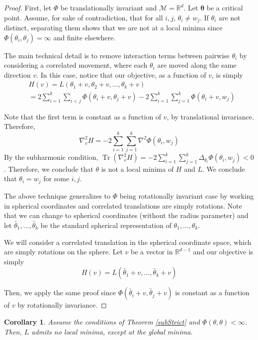 \documentclass{article}
\newtheorem{corollary}[theorem]{Corollary}
\newcommand{\R}{{\mathbb{R}}}
\DeclareMathOperator{\Tr}{Tr}
\begin{document}
\begin{proof}
First, let $\Phi$ be translationally invariant and $\mathcal{M} =
\R^d$. Let $\boldsymbol{\theta}$ be a critical point. Assume, for sake
of contradiction, that for all $i, j$, $\theta_i \neq w_j$. If
$\theta_i$ are not distinct, separating them shows that
we are not at a local minima since $\Phi(\theta_i,\theta_j) = \infty$
and finite elsewhere. 

The main technical detail is to remove interaction terms between
pairwise $\theta_i$ by considering a correlated movement, where each
$\theta_i$ are moved along the same direction $v$. In this case,
notice that our objective, as a function of $v$, is simply
\begin{align*}
& H(v) = L(\theta_1+ v, \theta_2 + v, ...,\theta_k + v) \\
& =  2\sum_{i=1}^k\sum_{i < j} \Phi(\theta_i+v,\theta_j+v) -
  2\sum_{i=1}^k\sum_{j=1}^k \Phi(\theta_i+v,w_j)
\end{align*}

Note that the first term is constant as a function of $v$, by
translational invariance. Therefore,
\[\nabla_{v}^2 H = -2\sum_{i=1}^k \sum_{j=1}^k \nabla^2\Phi(\theta_i, w_j)\]
By the subharmonic condition,
$\Tr(\nabla_{v}^2H) = -2\sum_{i=1}^k\sum_{j=1}^k
\Delta_{\theta_i}\Phi(\theta_i,w_j) < 0$.
Therefore, we conclude that $\theta$ is not a local minima of $H$ and
$L$.  We conclude that $\theta_i = w_j$ for some $i, j$.

The above technique generalizes to $\Phi$ being rotationally invariant case by
working in spherical coordinates and correlated translations are
simply rotations. Note that we can change to spherical coordinates (without the radius parameter) and let $\widetilde{\theta_1},...,\widetilde{\theta_{k}}$ be the standard spherical representation of $\theta_1,...,\theta_k$. 

We will consider a correlated translation in the spherical coordinate space, which are simply rotations on the sphere. Let $v$ be a vector in $\R^{d-1}$ and our objective is simply
\[ H(v) = L( \widetilde{\theta_1}+v,...,\widetilde{\theta_{k}} +v)\]

Then, we apply the same proof since $\Phi( \widetilde{\theta_i}+v, \widetilde{\theta_j}+v)$ is constant as a function of $v$ by rotationally invariance.
\end{proof}
%
\begin{corollary}
Assume the conditions of Theorem \ref{subStrict} and $\Phi(\theta,\theta) < \infty$. Then, $L$ admits no local minima, except at the global minima.
\end{corollary} 
\end{document}
